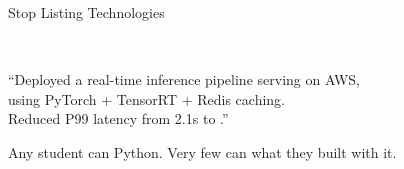 \begin{frame}{Stop Listing Technologies}
\begin{highlightbox}
  \footnotesize{}\\[0.3em]
  \footnotesize{}
\end{highlightbox}
\vspace{0.8em}
\begin{keybox}
  \footnotesize
  ``Deployed a real-time inference pipeline serving  on AWS,\\
  using PyTorch + TensorRT + Redis caching.\\
  Reduced P99 latency from 2.1s to .''
\end{keybox}
\vspace{0.8em}
\begin{center}
  {\small Any student can  Python.
  Very few can  what they built with it.}
\end{center}
\end{frame}


